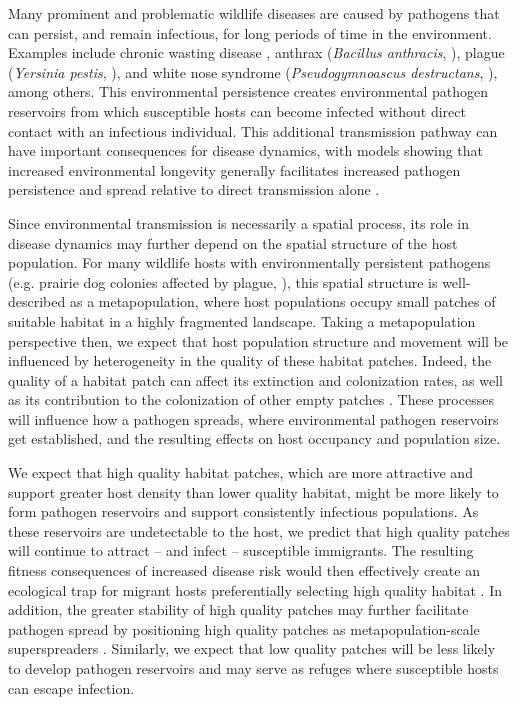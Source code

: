 \documentclass{article}
\begin{document}
Many prominent and problematic wildlife diseases are caused by pathogens that can persist, and remain infectious, for long periods of time in the environment.  Examples include chronic wasting disease \cite{Miller2006}, anthrax (\emph{Bacillus anthracis}, \cite{Dragon1995}), plague (\emph{Yersinia pestis}, \cite{Eisen2008}), and white nose syndrome (\emph{Pseudogymnoascus destructans}, \cite{Reynolds2015}), among others.  This environmental persistence creates environmental pathogen reservoirs from which susceptible hosts can become infected without direct contact with an infectious individual.  This additional transmission pathway can have important consequences for disease dynamics, with models showing that increased environmental longevity generally facilitates increased pathogen persistence and spread relative to direct transmission alone \cite{Almberg2011, Sharp2011, Breban2009}. 

Since environmental transmission is necessarily a spatial process, its role in disease dynamics may further depend on the spatial structure of the host population.
For many wildlife hosts with environmentally persistent pathogens (e.g. prairie dog colonies affected by plague, \cite{George2013}), this spatial structure is well-described as a metapopulation, where host populations occupy small patches of suitable habitat in a highly fragmented landscape.
Taking a metapopulation perspective then, we expect that host population structure and movement will be influenced by heterogeneity in the quality of these habitat patches.  Indeed, the quality of a habitat patch can affect its extinction and colonization rates, as well as its contribution to the colonization of other empty patches \cite{Moilanen1998}.  These processes will influence how a pathogen spreads, where environmental pathogen reservoirs get established, and the resulting effects on host occupancy and population size.  

We expect that high quality habitat patches, which are more attractive and support greater host density than lower quality habitat, might be more likely to form pathogen reservoirs and support consistently infectious populations.  As these reservoirs are undetectable to the host, we predict that high quality patches will continue to attract -- and infect -- susceptible immigrants.
The resulting fitness consequences of increased disease risk would then effectively create an ecological trap for migrant hosts preferentially selecting high quality habitat \cite{Robertson2006, Almberg2011}.  
In addition, the greater stability of high quality patches may further facilitate pathogen spread by positioning high quality patches as metapopulation-scale superspreaders \cite{Paull2012}.  Similarly, we expect that low quality patches will be less likely to develop pathogen reservoirs and may serve as refuges where susceptible hosts can escape infection.
\end{document}
